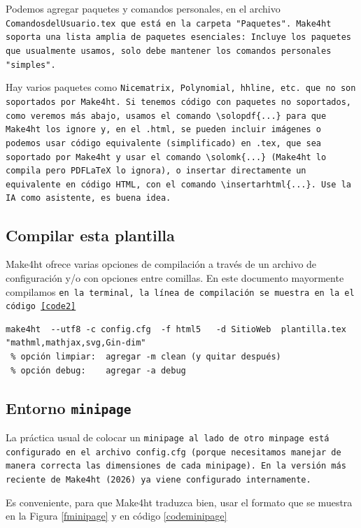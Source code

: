 \documentclass[fleqn,oneside]{article}
\begin{document}
  Podemos agregar paquetes y comandos personales, en el archivo \tt{ComandosdelUsuario.tex} que está en la carpeta "Paquetes".   Make4ht soporta una lista amplia de paquetes esenciales: Incluye los paquetes que usualmente usamos, solo debe mantener los comandos personales "simples".

 Hay varios paquetes como
\tt {Nicematrix, Polynomial, hhline}, etc. que no son soportados por Make4ht.
Si tenemos código con  paquetes no soportados, como veremos más abajo, usamos el comando \lstinline+\solopdf{...}+ para que Make4ht los ignore y,
en el \tt{.html}, se pueden incluir imágenes o podemos usar código equivalente (simplificado) en \tt{.tex}, que sea
soportado por Make4ht y usar el comando \lstinline+\solomk{...}+ (Make4ht lo compila pero PDFLaTeX lo ignora),
o insertar directamente un equivalente en código  HTML, con el comando \lstinline+\insertarhtml{...}+.
Use la IA como asistente, es buena idea.

 \subsection{Compilar esta plantilla} Make4ht  ofrece varias opciones de compilación a través de un archivo de configuración y/o con opciones entre comillas. En este documento mayormente compilamos
 \tt{en la terminal}, la línea de compilación se muestra en la el código \ref{code2}

 \bigskip\begin{lstlisting}[caption={Compilar en terminal}, label={code2}]
 make4ht  --utf8 -c config.cfg  -f html5   -d SitioWeb  plantilla.tex "mathml,mathjax,svg,Gin-dim"
 % opción limpiar:  agregar -m clean (y quitar después)
 % opción debug:    agregar -a debug
 \end{lstlisting}



 \subsection{Entorno \tt{minipage}}  La práctica usual de colocar un \tt{minipage} al lado de otro \tt{minpage} está configurado en el archivo \tt{config.cfg} (porque necesitamos manejar de manera correcta las dimensiones de cada \tt{minipage}). En la versión más reciente de Make4ht (2026) ya viene configurado internamente.

Es conveniente, para que Make4ht traduzca bien, usar el formato que se muestra en la Figura \ref{fminipage} y en código \ref{codeminipage}
\end{document}
